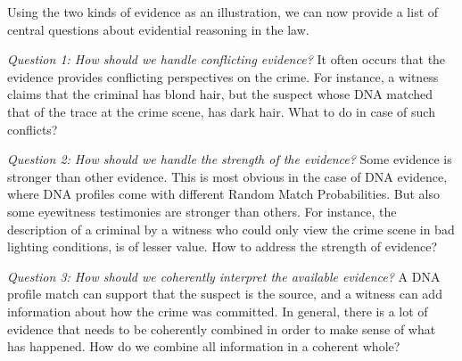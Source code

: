 \documentclass[10pt]{article}
\begin{document}
Using the two kinds of evidence as an illustration, we can now provide 
a list of central questions about evidential reasoning in the law. 

\textit{Question 1:	How should we handle conflicting evidence?}
It often occurs that the evidence provides conflicting perspectives on the crime. For instance, a witness claims that the criminal has blond hair, 
but the suspect whose DNA matched that of the trace at the crime scene, has dark hair. What to do in case of such conflicts? 

\textit{Question 2:	How should we handle the strength of the evidence?}
Some evidence is stronger than other evidence. This is most obvious in the case of DNA evidence, where DNA profiles come with different Random Match Probabilities. But also some eyewitness testimonies are stronger than others. For instance, the description of a criminal by a witness who could only view the crime scene in bad lighting conditions, is of lesser value. How to address the strength of evidence?

\textit{Question 3:	How should we coherently interpret the available evidence?}
A DNA profile match can support that the suspect is the source, and a witness can add information about how the crime was committed. In general, there is a lot of evidence that needs to be coherently combined in order to make sense of what has happened. How do we combine all information in a coherent whole?

\end{document}
